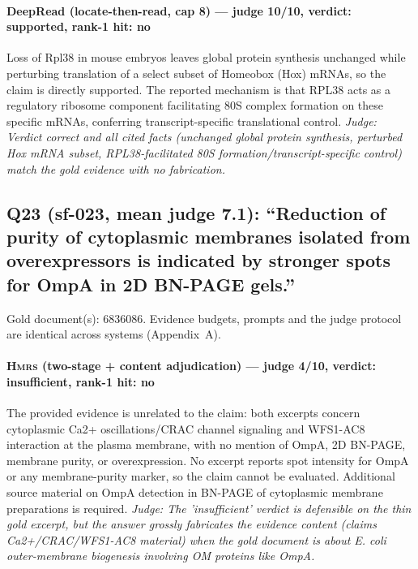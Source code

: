 \documentclass[sigconf, review, anonymous]{acmart}
\begin{document}
\paragraph{DeepRead (locate-then-read, cap 8) --- judge 10/10, verdict: supported, rank-1 hit: no}
\noindent Loss of Rpl38 in mouse embryos leaves global protein synthesis unchanged while perturbing translation of a select subset of Homeobox (Hox) mRNAs, so the claim is directly supported. The reported mechanism is that RPL38 acts as a regulatory ribosome component facilitating 80S complex formation on these specific mRNAs, conferring transcript-specific translational control.
\noindent\small\textit{Judge: Verdict correct and all cited facts (unchanged global protein synthesis, perturbed Hox mRNA subset, RPL38-facilitated 80S formation/transcript-specific control) match the gold evidence with no fabrication.}

\subsection{Q23 (sf-023, mean judge 7.1): ``Reduction of purity of cytoplasmic membranes isolated from overexpressors is indicated by stronger spots for OmpA in 2D BN-PAGE gels.''}
\label{app:q23}
\noindent Gold document(s): 6836086. Evidence budgets, prompts and the judge protocol are identical across systems (Appendix~A).
\paragraph{\textbf{\textsc{Hmrs}} (two-stage + content adjudication) --- judge 4/10, verdict: insufficient, rank-1 hit: no}
\noindent The provided evidence is unrelated to the claim: both excerpts concern cytoplasmic Ca2+ oscillations/CRAC channel signaling and WFS1-AC8 interaction at the plasma membrane, with no mention of OmpA, 2D BN-PAGE, membrane purity, or overexpression. No excerpt reports spot intensity for OmpA or any membrane-purity marker, so the claim cannot be evaluated. Additional source material on OmpA detection in BN-PAGE of cytoplasmic membrane preparations is required.
\noindent\small\textit{Judge: The 'insufficient' verdict is defensible on the thin gold excerpt, but the answer grossly fabricates the evidence content (claims Ca2+/CRAC/WFS1-AC8 material) when the gold document is about E. coli outer-membrane biogenesis involving OM proteins like OmpA.}
\end{document}
